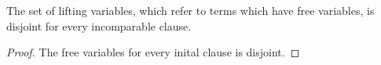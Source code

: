 \documentclass[,%
	paper=a4,%
	DIV12, %
	twoside=false,%
	liststotoc,
	bibtotoc,
	draft=false,%
	numbers=noendperiod
]{scrartcl}
\begin{document}
\begin{comment}
	\cbstart
	\begin{lemma}[Strenghtening of \ref{lemma:literal_in_clause_similar}]
		\label{lemma:literal_in_clause_similar_strenghtened}

		If $s\cl$ is a lifting variable $z_i$ and $\lifboth{s} = z_j$ (i.e.\ $s=\colterm{j}$),
		then there is a substitution $\rho$ such that $\colterm{i}\rho = \colterm{j}$.
	\end{lemma} 
	\begin{proof}
		Note that if $i=j$, the $\rho$ is the identity function.

		Note that by Lemma~\ref{lemma:literal_in_clause_similar}, $s\cl \sim \lifboth{s}$.

		At some point in the resolution proof, $s\cl = z_i$ was introduced in $\AIclause(C^*)$ for a clause $C^*$. 
		Hence the corresponding term in $C^*$ is $\colterm{i}$.

		In the resolution derivation, $\colterm{i}$ is, in general, changed by means of substitution, so $s$ in later stages of the proof refers to $\colterm{i}\sigma^*$ for some $\sigma^*$.

		If $z_i$ is never affected by $\tau$, we are done.

		Suppose that at the position of $s\cl$, $z_k$ is introduced and later changed to $z_i$.
		We have to show that there is a substitution $\rho$ such that $\colterm{k}\rho = \colterm{i}$.
		See Lemma~\ref{lemma:tau_is_specialisation}.
	\end{proof}
	\cbend
\end{comment}



\begin{lemma}
	\label{lemma:disjoint_lifting_variables}
	The set of lifting variables, which refer to terms which have free variables, is disjoint for every incomparable clause.
\end{lemma}
\begin{proof}
	The free variables for every inital clause is disjoint.
\end{proof}
\end{document}
